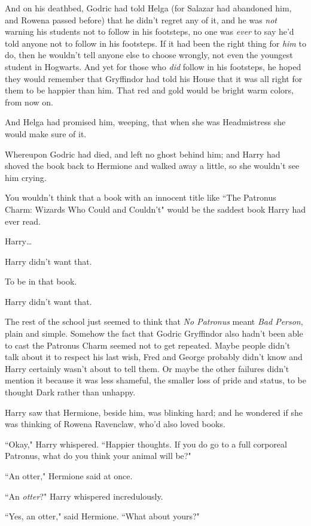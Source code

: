 And on his deathbed, Godric had told Helga (for Salazar had abandoned him, and Rowena passed before) that he didn't regret any of it, and he was \emph{not} warning his students not to follow in his footsteps, no one was \emph{ever} to say he'd told anyone not to follow in his footsteps. If it had been the right thing for \emph{him} to do, then he wouldn't tell anyone else to choose wrongly, not even the youngest student in Hogwarts. And yet for those who \emph{did} follow in his footsteps, he hoped they would remember that Gryffindor had told his House that it was all right for them to be happier than him. That red and gold would be bright warm colors, from now on.

And Helga had promised him, weeping, that when she was Headmistress she would make sure of it.

Whereupon Godric had died, and left no ghost behind him; and Harry had shoved the book back to Hermione and walked away a little, so she wouldn't see him crying.

You wouldn't think that a book with an innocent title like ``The Patronus Charm: Wizards Who Could and Couldn't" would be the saddest book Harry had ever read.

Harry{\ldots}

Harry didn't want that.

To be in that book.

Harry didn't want that.

The rest of the school just seemed to think that \emph{No Patronus} meant \emph{Bad Person}, plain and simple. Somehow the fact that Godric Gryffindor also hadn't been able to cast the Patronus Charm seemed not to get repeated. Maybe people didn't talk about it to respect his last wish, Fred and George probably didn't know and Harry certainly wasn't about to tell them. Or maybe the other failures didn't mention it because it was less shameful, the smaller loss of pride and status, to be thought Dark rather than unhappy.

Harry saw that Hermione, beside him, was blinking hard; and he wondered if she was thinking of Rowena Ravenclaw, who'd also loved books.

``Okay," Harry whispered. ``Happier thoughts. If you do go to a full corporeal Patronus, what do you think your animal will be?"

``An otter," Hermione said at once.

``An \emph{otter}?" Harry whispered incredulously.

``Yes, an otter," said Hermione. ``What about yours?"

